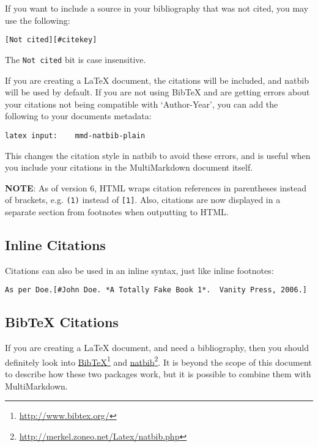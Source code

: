 If you want to include a source in your bibliography that was not cited, you may use the following:

\begin{verbatim}
[Not cited][#citekey]
\end{verbatim}

The \texttt{Not cited} bit is case insensitive.

If you are creating a LaTeX document, the citations will be included, and natbib will be used by default. If you are not using BibTeX and are getting errors about your citations not being compatible with `Author-Year', you can add the following to your documents metadata:

\begin{verbatim}
latex input:	mmd-natbib-plain
\end{verbatim}

This changes the citation style in natbib to avoid these errors, and is useful when you include your citations in the MultiMarkdown document itself.

\textbf{NOTE}: As of version 6, HTML wraps citation references in parentheses instead of brackets, e.g. \texttt{(1)} instead of \texttt{[1]}. Also, citations are now displayed in a separate section from footnotes when outputting to HTML.

\subsection{Inline Citations}
\label{inlinecitations}

Citations can also be used in an inline syntax, just like inline footnotes:

\begin{verbatim}
As per Doe.[#John Doe. *A Totally Fake Book 1*.  Vanity Press, 2006.]
\end{verbatim}

\subsection{BibTeX Citations}
\label{bibtexcitations}

If you are creating a LaTeX document, and need a bibliography, then you should definitely look into \href{http://www.bibtex.org/}{BibTeX}\footnote{\href{http://www.bibtex.org/}{http:\slash{}\slash{}www.bibtex.org\slash{}}} and \href{http://merkel.zoneo.net/Latex/natbib.php}{natbib}\footnote{\href{http://merkel.zoneo.net/Latex/natbib.php}{http:\slash{}\slash{}merkel.zoneo.net\slash{}Latex\slash{}natbib.php}}. It is beyond the scope of this document to describe how these two packages work, but it is possible to combine them with MultiMarkdown.

